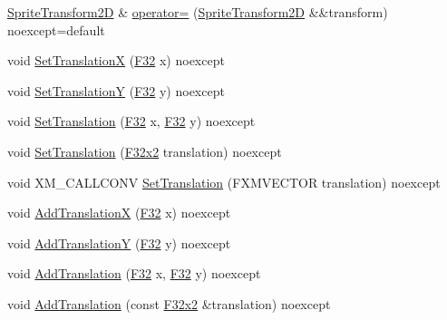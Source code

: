 \begin{DoxyCompactItemize}
\item 
\mbox{\hyperlink{classmage_1_1_sprite_transform2_d}{Sprite\+Transform2D}} \& \mbox{\hyperlink{classmage_1_1_sprite_transform2_d_a49afb6168a0db37a2cbb6d604915672d}{operator=}} (\mbox{\hyperlink{classmage_1_1_sprite_transform2_d}{Sprite\+Transform2D}} \&\&transform) noexcept=default
\item 
void \mbox{\hyperlink{classmage_1_1_sprite_transform2_d_a5122ff8f8eb34f5706459056799d2ea0}{Set\+TranslationX}} (\mbox{\hyperlink{namespacemage_aa97e833b45f06d60a0a9c4fc22ae02c0}{F32}} x) noexcept
\item 
void \mbox{\hyperlink{classmage_1_1_sprite_transform2_d_ae4cb2b619c8a16f97cc854e3a2b99b10}{Set\+TranslationY}} (\mbox{\hyperlink{namespacemage_aa97e833b45f06d60a0a9c4fc22ae02c0}{F32}} y) noexcept
\item 
void \mbox{\hyperlink{classmage_1_1_sprite_transform2_d_ae4f737a593b5adc42bd89b6049246a4e}{Set\+Translation}} (\mbox{\hyperlink{namespacemage_aa97e833b45f06d60a0a9c4fc22ae02c0}{F32}} x, \mbox{\hyperlink{namespacemage_aa97e833b45f06d60a0a9c4fc22ae02c0}{F32}} y) noexcept
\item 
void \mbox{\hyperlink{classmage_1_1_sprite_transform2_d_ad067fd69b1afa47d67c184b4cac4570a}{Set\+Translation}} (\mbox{\hyperlink{namespacemage_aee4759dedc8def6c6dec26b5c7eddf29}{F32x2}} translation) noexcept
\item 
void X\+M\+\_\+\+C\+A\+L\+L\+C\+O\+NV \mbox{\hyperlink{classmage_1_1_sprite_transform2_d_a9dae6611daf11bf7fdfdcba4476968cb}{Set\+Translation}} (F\+X\+M\+V\+E\+C\+T\+OR translation) noexcept
\item 
void \mbox{\hyperlink{classmage_1_1_sprite_transform2_d_a5370564c49658402f24a42216eea12a2}{Add\+TranslationX}} (\mbox{\hyperlink{namespacemage_aa97e833b45f06d60a0a9c4fc22ae02c0}{F32}} x) noexcept
\item 
void \mbox{\hyperlink{classmage_1_1_sprite_transform2_d_a1628a0e11218c13e578293e68e3e14cd}{Add\+TranslationY}} (\mbox{\hyperlink{namespacemage_aa97e833b45f06d60a0a9c4fc22ae02c0}{F32}} y) noexcept
\item 
void \mbox{\hyperlink{classmage_1_1_sprite_transform2_d_ade83dd0ee8cedea2420a90b510c7f6b9}{Add\+Translation}} (\mbox{\hyperlink{namespacemage_aa97e833b45f06d60a0a9c4fc22ae02c0}{F32}} x, \mbox{\hyperlink{namespacemage_aa97e833b45f06d60a0a9c4fc22ae02c0}{F32}} y) noexcept
\item 
void \mbox{\hyperlink{classmage_1_1_sprite_transform2_d_ac75d5a74f69ce63ff5f8781b0ce5cc8c}{Add\+Translation}} (const \mbox{\hyperlink{namespacemage_aee4759dedc8def6c6dec26b5c7eddf29}{F32x2}} \&translation) noexcept

\end{DoxyCompactItemize}
